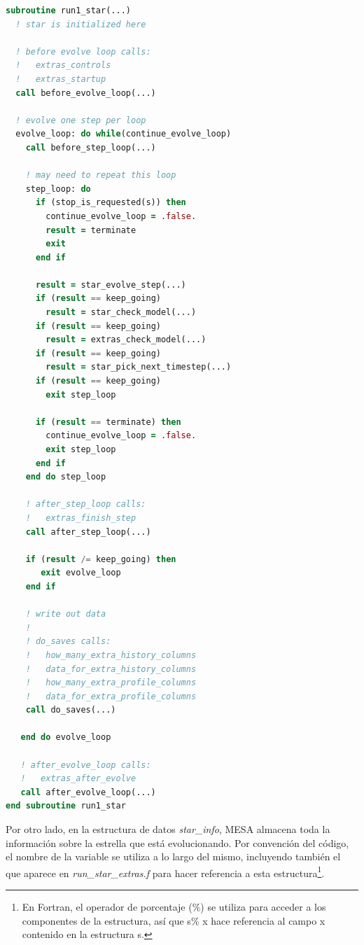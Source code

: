 \begin{lstlisting}[language=Fortran, float, caption={Bucle de control principal sobre el que itera MESA en cada paso temporal.}, label={lst:bucle_ctrl}]
subroutine run1_star(...)
  ! star is initialized here

  ! before evolve loop calls:
  !   extras_controls
  !   extras_startup
  call before_evolve_loop(...)

  ! evolve one step per loop
  evolve_loop: do while(continue_evolve_loop)
    call before_step_loop(...)

    ! may need to repeat this loop
    step_loop: do 
      if (stop_is_requested(s)) then
        continue_evolve_loop = .false.
        result = terminate
        exit
      end if

      result = star_evolve_step(...)
      if (result == keep_going) 
        result = star_check_model(...)
      if (result == keep_going) 
        result = extras_check_model(...)
      if (result == keep_going)
        result = star_pick_next_timestep(...)
      if (result == keep_going) 
        exit step_loop

      if (result == terminate) then
        continue_evolve_loop = .false.
        exit step_loop
      end if
    end do step_loop

    ! after_step_loop calls:
    !   extras_finish_step
    call after_step_loop(...)

    if (result /= keep_going) then
       exit evolve_loop
    end if

    ! write out data
    !
    ! do_saves calls:
    !   how_many_extra_history_columns
    !   data_for_extra_history_columns
    !   how_many_extra_profile_columns
    !   data_for_extra_profile_columns
    call do_saves(...)

   end do evolve_loop

   ! after_evolve_loop calls:
   !   extras_after_evolve
   call after_evolve_loop(...)
end subroutine run1_star
\end{lstlisting}

Por otro lado, en la estructura de datos \textit{star\_info}, MESA almacena toda la información sobre la estrella que está evolucionando. Por convención del código, el nombre de la variable se utiliza a lo largo del mismo, incluyendo también el que aparece en \textit{run\_star\_extras.f} para hacer referencia a esta estructura\footnote{En Fortran, el operador de porcentaje (\%) se utiliza para acceder a los componentes de la estructura, así que s\% x hace referencia al campo x contenido en la estructura s.}.\par

